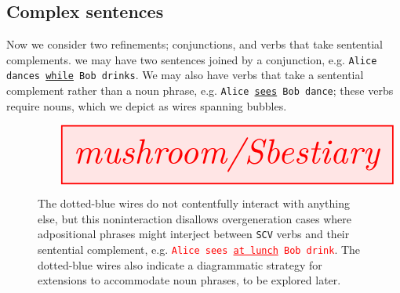 \clearpage

\subsection{Complex sentences}

Now we consider two refinements; conjunctions, and verbs that take sentential complements. we may have two sentences joined by a conjunction, e.g. \texttt{Alice dances \underline{while} Bob drinks}. We may also have verbs that take a sentential complement rather than a noun phrase, e.g. \texttt{Alice \underline{sees} Bob dance}; these verbs require nouns, which we depict as wires spanning bubbles.

\begin{figure}[h!]\label{fig:sentbestiary}
\centering
\[
\resizebox{\textwidth}{!}{\tikzfig{mushroom/Sbestiary}}
\]
\caption{The dotted-blue wires do not contentfully interact with anything else, but this noninteraction disallows overgeneration cases where adpositional phrases might interject between \texttt{SCV} verbs and their sentential complement, e.g. \textcolor{red}{\texttt{Alice sees \underline{at lunch} Bob drink}}. The dotted-blue wires also indicate a diagrammatic strategy for extensions to accommodate noun phrases, to be explored later.}
\end{figure}



